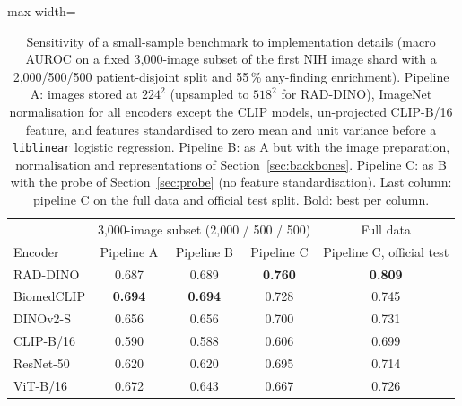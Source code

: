 \begin{table}[H]\centering
\scriptsize
\caption{Sensitivity of a small-sample benchmark to implementation details (macro AUROC on a fixed 3,000-image subset of the first NIH image shard with a 2,000/500/500 patient-disjoint split and 55\,\% any-finding enrichment). Pipeline A: images stored at $224^2$ (upsampled to $518^2$ for RAD-DINO), ImageNet normalisation for all encoders except the CLIP models, un-projected CLIP-B/16 feature, and features standardised to zero mean and unit variance before a \texttt{liblinear} logistic regression. Pipeline B: as A but with the image preparation, normalisation and representations of Section~\ref{sec:backbones}. Pipeline C: as B with the probe of Section~\ref{sec:probe} (no feature standardisation). Last column: pipeline C on the full data and official test split. Bold: best per column.}\label{tab:decomposition}
\begin{adjustbox}{max width=\linewidth}
\begin{tabular}{lcccc}
\toprule
 & \multicolumn{3}{c}{3,000-image subset (2,000 / 500 / 500)} & Full data \\ Encoder & Pipeline A & Pipeline B & Pipeline C & Pipeline C, official test \\
\midrule
RAD-DINO & 0.687 & 0.689 & \textbf{0.760} & \textbf{0.809} \\
BiomedCLIP & \textbf{0.694} & \textbf{0.694} & 0.728 & 0.745 \\
DINOv2-S & 0.656 & 0.656 & 0.700 & 0.731 \\
CLIP-B/16 & 0.590 & 0.588 & 0.606 & 0.699 \\
ResNet-50 & 0.620 & 0.620 & 0.695 & 0.714 \\
ViT-B/16 & 0.672 & 0.643 & 0.667 & 0.726 \\
\bottomrule
\end{tabular}
\end{adjustbox}
\end{table}
